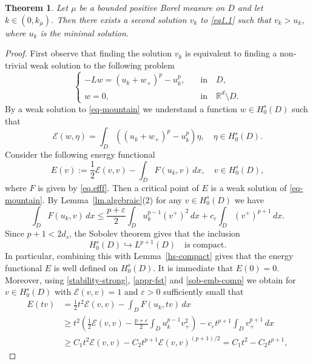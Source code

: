\documentclass[11pt,a4paper,reqno]{amsart}
\newtheorem{theorem}{\bf Theorem}[section]
\theoremstyle{definition}
\numberwithin{equation}{section}
\begin{document}
\begin{theorem}
\label{mountain-pass-sol} 
 Let  $\mu$ be a bounded positive Borel measure on $D$ and let $k\in(0,k_\mu)$. 
 Then there exists a second  solution $v_k$ to \eqref{eq1.1} such that 
 $v_k>u_k$, where $u_k$ is the minimal solution.
\end{theorem}
\begin{proof}
First observe that finding the   solution $v_k$ is equivalent to finding a non-trivial weak solution to the following problem
\begin{equation}\label{eq-mountain}
\begin{cases}
-Lw=(u_k+w_+)^p-u_k^p,\quad &\text{in}\quad D, \\
w=0,\quad &\text{in}\quad\mathbb{R}^d\setminus D.
\end{cases}
\end{equation}
By a weak solution to \eqref{eq-mountain} we understand a function  $w\in H_0^s(D)$
such that 
\[
\mathcal E(w,\eta)=\int_D((u_k+w_+)^p-u_k^p)\eta,\quad \eta\in H^s_0(D).
\]
Consider the following energy functional
\[
E(v):=\frac{1}{2}\mathcal{E}(v,v)-\int_D F(u_k,v)\,dx,\quad v\in H^s_0(D),
\]
where $F$ is given by \eqref{eq.efff}. 
Then a critical point of $E$ is a weak solution of \eqref{eq-mountain}. 
By Lemma~\ref{lm.algebraic}(2) for any $v\in H^s_0(D)$ we have
\begin{equation}\label{appr-fst}
\int_D F(u_k,v)\,dx\le \frac{p+\varepsilon}{2}\int_D u_k^{p-1}(v^+)^2\,dx+c_\varepsilon\int_D (v^+)^{p+1}\,dx.
\end{equation}
Since $p+1<2d_s$, the Sobolev theorem gives that the inclusion
\begin{equation}\label{sob-emb-comp}
H^s_0(D)\hookrightarrow L^{p+1}(D)\quad\text{is compact.}
\end{equation}
In particular, combining this with Lemma~\ref{hs-compact} gives that  the energy functional $E$ is well defined on 
$H^s_0(D)$. It is immediate that $E(0)=0$. Moreover, using \eqref{stability-strong}, \eqref{appr-fst} 
and \eqref{sob-emb-comp} we obtain for $v\in H^s_0(D)$ with $\mathcal E(v,v)=1$ and $\varepsilon>0$ sufficiently small that
\begin{align*}
E(tv)&=\frac{1}{2}t^2\mathcal E(v,v)-\int_D F(u_k,tv)\,dx\\
&\geq t^2\left(\frac{1}{2}\mathcal E(v,v)-\frac{p+\varepsilon}{2}\int_D u_k^{p-1}v_+^2\right)-c_\varepsilon t^{p+1}\int_D v_+^{p+1}\,dx\\
&\geq C_1t^2\mathcal E(v,v)-C_2t^{p+1}\mathcal E(v,v)^{(p+1)/2}=C_1t^2-C_2t^{p+1},

\end{align*}
\end{proof}
\end{document}
